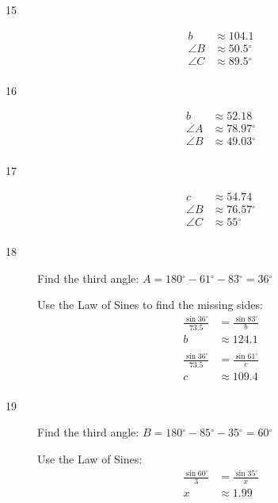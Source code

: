 \documentclass{exam}
\newcommand{\dg}{\ensuremath{^\circ}}
\begin{document}
\begin{description}
      \item[15]
        \begin{align*}
          b        & \approx 104.1 \\
          \angle B & \approx 50.5 \dg \\
          \angle C & \approx 89.5 \dg \\
        \end{align*}

      \item[16]
        \begin{align*}
          b        & \approx 52.18 \\
          \angle A & \approx 78.97 \dg \\
          \angle B & \approx 49.03 \dg \\
        \end{align*}

      \item[17]
        \begin{align*}
          c        & \approx 54.74 \\
          \angle B & \approx 76.57 \dg \\
          \angle C & \approx 55 \dg \\
        \end{align*}

      \item[18]
        Find the third angle: $A = 180 \dg - 61 \dg - 83 \dg = 36 \dg$

        Use the Law of Sines to find the missing sides:
        \begin{align*}
          \frac{\sin 36 \dg}{73.5} & = \frac{\sin 83 \dg}{b} \\
          b                        & \approx 124.1 \\
          \\
          \frac{\sin 36 \dg}{73.5} & = \frac{\sin 61 \dg}{c} \\
          c                        & \approx 109.4 \\
        \end{align*}

      \item[19]
        Find the third angle: $B = 180 \dg - 85 \dg - 35 \dg = 60 \dg$

        Use the Law of Sines:
        \begin{align*}
          \frac{\sin 60 \dg}{3} & = \frac{\sin 35 \dg}{x} \\
          x                        & \approx \boxed{ 1.99 } \\
        \end{align*}


\end{description}
\end{document}
